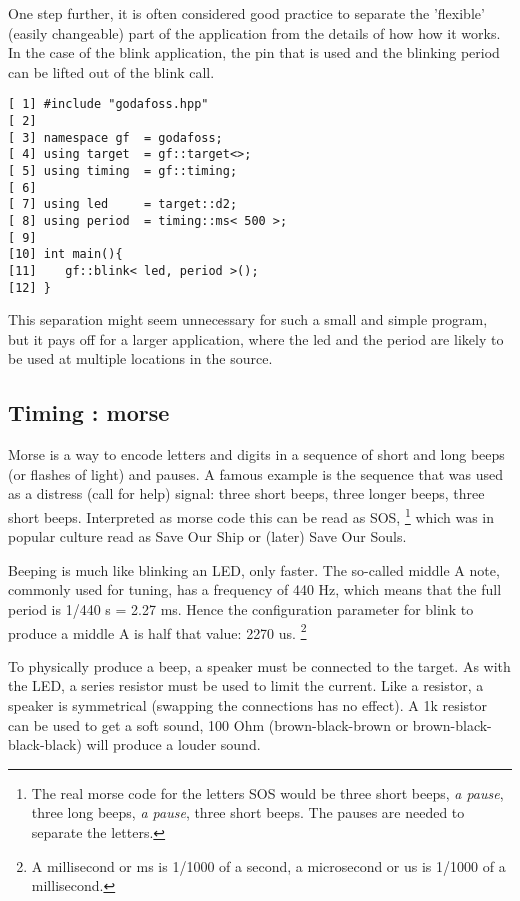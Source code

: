 \documentclass{article}
\begin{document}
One step further, it is often considered good practice to separate
the 'flexible' (easily changeable) part of the application from
the details of how how it works.
In the case of the blink application, the pin that is used and the
blinking period can be lifted out of the blink call.

\lstset {language=C++}
\begin{lstlisting}
[ 1] #include "godafoss.hpp"
[ 2]
[ 3] namespace gf  = godafoss;
[ 4] using target  = gf::target<>;
[ 5] using timing  = gf::timing;
[ 6]
[ 7] using led     = target::d2;
[ 8] using period  = timing::ms< 500 >;
[ 9]
[10] int main(){
[11]    gf::blink< led, period >();
[12] }
\end{lstlisting}

This separation might seem unnecessary for such a small and simple
program, but it pays off for a larger application,
where the led and the period are likely to be used at
multiple locations in the source.

\subsection{Timing : morse}

Morse is a way to encode letters and digits in a sequence of
short and long beeps (or flashes of light) and pauses.
A famous example is the sequence that was used as a distress
(call for help) signal: three short beeps, three longer beeps,
three short beeps.
Interpreted as morse code this can be read as SOS,
\footnote{The real morse code for the letters SOS would be
three short beeps, \textit{a pause}, three long beeps, \textit{a pause},
three short beeps. The pauses are needed to separate the letters.}
which was in popular culture read as Save Our Ship or
(later) Save Our Souls.

Beeping is much like blinking an LED, only faster.
The so-called middle A note, commonly used for tuning, has a frequency
of 440 Hz, which means that the full period is 1/440 s = 2.27 ms.
Hence the configuration parameter for blink to produce a middle A
is half that value: 2270 us.
\footnote{A millisecond or ms is 1/1000 of a second, a microsecond or us
is 1/1000 of a millisecond.}

To physically produce a beep, a speaker must be connected to the target.
As with the LED, a series resistor must be used to limit the current.
Like a resistor, a speaker is symmetrical
(swapping the connections has no effect).
A 1k resistor can be used to get a soft sound, 100 Ohm
(brown-black-brown or brown-black-black-black)
will produce a louder sound.
\end{document}
